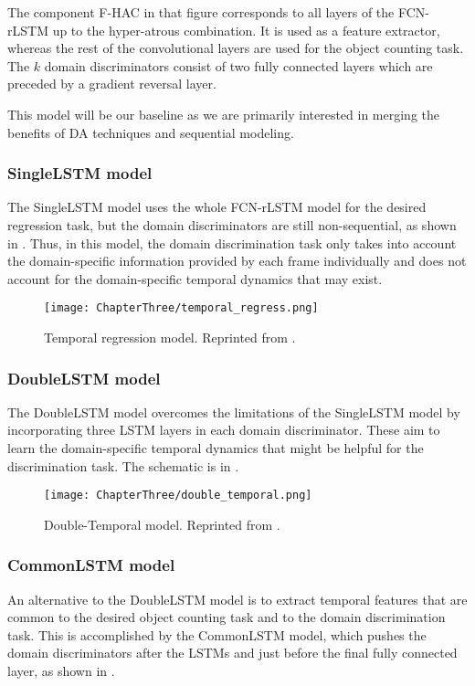 The component F-HAC in that figure corresponds to all layers of the FCN-rLSTM up to the hyper-atrous combination. It is used as a feature extractor, whereas the rest of the convolutional layers are used for the object counting task. The $k$ domain discriminators consist of two fully connected layers which are preceded by a gradient reversal layer.

This model will be our baseline as we are primarily interested in merging the benefits of DA techniques and sequential modeling.

\subsubsection{SingleLSTM model}
The SingleLSTM model uses the whole FCN-rLSTM model for the desired regression task, but the domain discriminators are still non-sequential, as shown in . Thus, in this model, the domain discrimination task only takes into account the domain-specific information provided by each frame individually and does not account for the domain-specific temporal dynamics that may exist.

\begin{figure}[h!]
	\centering
	\texttt{[image: ChapterThree/temporal\_regress.png]}
	\caption{Temporal regression model. Reprinted from \citet{ThesisFrancisco}.}
	\label{fig:temporal_regress_model}
\end{figure}

\subsubsection{DoubleLSTM model}
The DoubleLSTM model overcomes the limitations of the SingleLSTM model by incorporating three LSTM layers in each domain discriminator. These aim to learn the domain-specific temporal dynamics that might be helpful for the discrimination task. The schematic is in .

\begin{figure}[!ht]
	\centering
	\texttt{[image: ChapterThree/double\_temporal.png]}
	\caption{Double-Temporal model. Reprinted from \citet{ThesisFrancisco}.}
	\label{fig:double_temporal_model}
\end{figure}

\subsubsection{CommonLSTM model}
An alternative to the DoubleLSTM model is to extract temporal features that are common to the desired object counting task and to the domain discrimination task. This is accomplished by the CommonLSTM model, which pushes the domain discriminators after the LSTMs and just before the final fully connected layer, as shown in .

